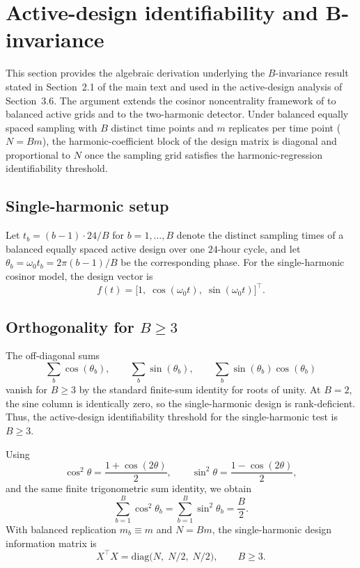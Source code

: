 \documentclass{article}
\begin{document}
\section{Active-design identifiability and B-invariance}
\label{sec:b_invariance}

This section provides the algebraic derivation underlying the
$B$-invariance result stated in Section~2.1 of the main text and used in
the active-design analysis of Section~3.6. The argument extends the
cosinor noncentrality framework of \citet{zong2023circapower} to balanced
active grids and to the two-harmonic detector. Under balanced equally
spaced sampling with $B$ distinct time points and $m$ replicates per time
point ($N = Bm$), the harmonic-coefficient block of the design matrix is
diagonal and proportional to $N$ once the sampling grid satisfies the
harmonic-regression identifiability threshold.

\subsection{Single-harmonic setup}

Let $t_b = (b - 1) \cdot 24 / B$ for $b = 1, \ldots, B$ denote the
distinct sampling times of a balanced equally spaced active design over
one $24$-hour cycle, and let
$\theta_b = \omega_0 t_b = 2\pi (b - 1)/B$ be the corresponding phase.
For the single-harmonic cosinor model, the design vector is
\[
f(t)
=
\big[
1,\; \cos(\omega_0 t),\; \sin(\omega_0 t)
\big]^\top .
\]

\subsection{Orthogonality for $B \geq 3$}

The off-diagonal sums
\[
\sum_b \cos(\theta_b),
\qquad
\sum_b \sin(\theta_b),
\qquad
\sum_b \sin(\theta_b)\cos(\theta_b)
\]
vanish for $B \geq 3$ by the standard finite-sum identity for roots of
unity. At $B=2$, the sine column is identically zero, so the
single-harmonic design is rank-deficient. Thus, the active-design
identifiability threshold for the single-harmonic test is $B \geq 3$.

Using
\[
\cos^2\theta = \frac{1+\cos(2\theta)}{2},
\qquad
\sin^2\theta = \frac{1-\cos(2\theta)}{2},
\]
and the same finite trigonometric sum identity, we obtain
\[
\sum_{b=1}^{B}\cos^2\theta_b
=
\sum_{b=1}^{B}\sin^2\theta_b
=
\frac{B}{2}.
\]
With balanced replication $m_b \equiv m$ and $N=Bm$, the single-harmonic
design information matrix is
\begin{equation}
X^\top X
=
\mathrm{diag}
\big(
N,\; N/2,\; N/2
\big),
\qquad
B \geq 3.
\label{eq:supp_xtx_balanced}
\end{equation}
\end{document}
